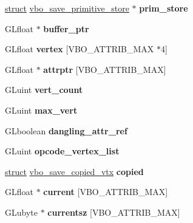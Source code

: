 \begin{DoxyCompactItemize}
\hyperlink{interfacestruct}{struct} \hyperlink{structvbo__save__primitive__store}{vbo\+\_\+save\+\_\+primitive\+\_\+store} $\ast$ {\bfseries prim\+\_\+store}
\item 
\mbox{\label{structvbo__save__context_ab30cfb072831ff063d1b61cfbc17198f}} 
G\+Lfloat $\ast$ {\bfseries buffer\+\_\+ptr}
\item 
\mbox{\label{structvbo__save__context_a19ca4554e152469300a24655e5082d1c}} 
G\+Lfloat {\bfseries vertex} \mbox{[}V\+B\+O\+\_\+\+A\+T\+T\+R\+I\+B\+\_\+\+M\+AX $\ast$4\mbox{]}
\item 
\mbox{\label{structvbo__save__context_aad4ef6f656ab2bedf0710f1626fba7e5}} 
G\+Lfloat $\ast$ {\bfseries attrptr} \mbox{[}V\+B\+O\+\_\+\+A\+T\+T\+R\+I\+B\+\_\+\+M\+AX\mbox{]}
\item 
\mbox{\label{structvbo__save__context_a9b4abaaf846a02437595cad4feeb2a51}} 
G\+Luint {\bfseries vert\+\_\+count}
\item 
\mbox{\label{structvbo__save__context_ac49469f78b315c6c24965d32ce90495b}} 
G\+Luint {\bfseries max\+\_\+vert}
\item 
\mbox{\label{structvbo__save__context_a631faaf10c17b2d9ba591e22bf1f4c0d}} 
G\+Lboolean {\bfseries dangling\+\_\+attr\+\_\+ref}
\item 
\mbox{\label{structvbo__save__context_a1df194cb124120acb62069f8978974e9}} 
G\+Luint {\bfseries opcode\+\_\+vertex\+\_\+list}
\item 
\mbox{\label{structvbo__save__context_accd70c1350a42997a7308aa16536ddcb}} 
\hyperlink{interfacestruct}{struct} \hyperlink{structvbo__save__copied__vtx}{vbo\+\_\+save\+\_\+copied\+\_\+vtx} {\bfseries copied}
\item 
\mbox{\label{structvbo__save__context_aa2d45ae46fa77044e217887d0c1bbd22}} 
G\+Lfloat $\ast$ {\bfseries current} \mbox{[}V\+B\+O\+\_\+\+A\+T\+T\+R\+I\+B\+\_\+\+M\+AX\mbox{]}
\item 
\mbox{\label{structvbo__save__context_a780b40007532151348a3a8da36ef567d}} 
G\+Lubyte $\ast$ {\bfseries currentsz} \mbox{[}V\+B\+O\+\_\+\+A\+T\+T\+R\+I\+B\+\_\+\+M\+AX\mbox{]}
\end{DoxyCompactItemize}


